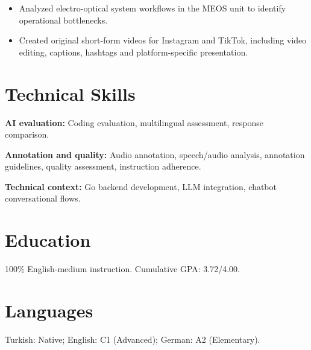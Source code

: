 \documentclass[10pt,a4paper]{article}
\begin{document}
\begin{itemize}
  \item Analyzed electro-optical system workflows in the MEOS unit to identify operational bottlenecks.
\end{itemize}

\begin{itemize}
  \item Created original short-form videos for Instagram and TikTok, including video editing,
        captions, hashtags and platform-specific presentation.
\end{itemize}

\section{Technical Skills}
\textbf{AI evaluation:} Coding evaluation, multilingual assessment, response comparison.\par
\textbf{Annotation and quality:} Audio annotation, speech/audio analysis, annotation guidelines,
quality assessment, instruction adherence.\par
\textbf{Technical context:} Go backend development, LLM integration, chatbot conversational flows.

\section{Education}
100\% English-medium instruction. Cumulative GPA: 3.72/4.00.

\section{Languages}
Turkish: Native; English: C1 (Advanced); German: A2 (Elementary).
\end{document}
